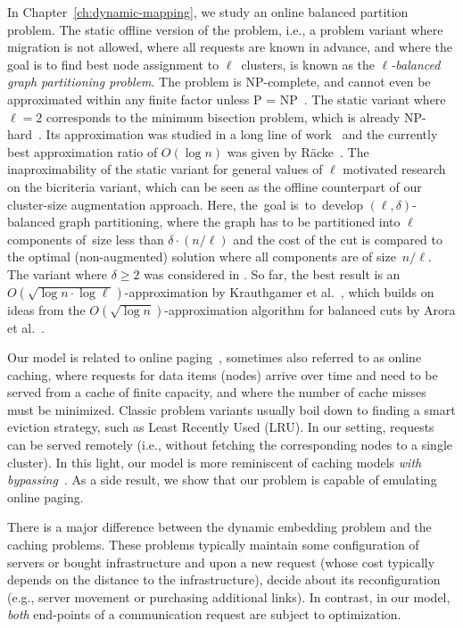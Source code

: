 In Chapter~\ref{ch:dynamic-mapping}, we study an online balanced partition problem.
The static offline version of the problem, i.e., a problem variant where
migration is not allowed, where all requests are known in advance, and where
the goal is to find best node assignment to $\ell$~clusters, is known as the
\emph{$\ell$-balanced graph partitioning problem}. The problem is 
NP-complete, and cannot even be approximated within any finite factor unless P
= NP~\cite{AndRae06}.  The static
variant where $\ell = 2$ corresponds to the minimum bisection problem, which
is already NP-hard~\cite{GaJoSt76}.
Its approximation was studied in a long
line of work~\cite{SarVaz95,ArKaKa99,FeKrNi00,FeiKra02,KraFei06,Raec08} and
the currently best approximation ratio of $O(\log n)$ was given by
R{\"{a}}cke~\cite{Raec08}.
The inaproximability of the static variant for general values of $\ell$
motivated research on the bicriteria variant, which can be seen as the offline
counterpart of our cluster-size augmentation approach. Here, the~goal
is~to~develop $(\ell,\delta)$-balanced graph partitioning, where the graph has
to be partitioned into $\ell$ components of~size less than $\delta \cdot (n /
\ell)$ and the cost of the cut is compared to the optimal (non-augmented)
solution where all components are of size~$n / \ell$. The variant where
$\delta \geq 2$ was considered in
\cite{LeMaTr90,SimTen97,EvNaRS00,EvNaRS99,KrNaSc09}. So far, the best result is
an $O(\!\sqrt{\log n \cdot \log \ell})$-approximation by Krauthgamer et
al.~\cite{KrNaSc09}, which builds on ideas from the $O(\!\sqrt{\log
n})$-approximation algorithm for balanced cuts by Arora et al.~\cite{ArRaVa09}.

Our model is related to online
paging~\cite{SleTar85,FKLMSY91,McGSle91,AcChNo00}, sometimes also referred to
as online caching, where requests for data items (nodes) arrive over time and
need to be served from a cache of finite capacity, and where the number of
cache misses must be minimized. Classic problem variants usually boil down to
finding a smart eviction strategy, such as Least Recently Used (LRU). In our
setting, requests can be served remotely (i.e., without fetching the
corresponding nodes to a single cluster). In this light, our model is more
reminiscent of caching models \emph{with
bypassing}~\cite{EpImLN11,EpImLN15,Irani02}. As a side result, we show that our problem is
capable of emulating online paging.

There is a major difference between the dynamic embedding problem and the caching problems.
These problems typically maintain some configuration of servers or
bought infrastructure and upon a new request (whose cost typically depends on
the distance to the infrastructure), decide about its reconfiguration (e.g.,
server movement or purchasing additional links). In contrast, in our model,
\emph{both} end-points of a communication request are subject to optimization.



